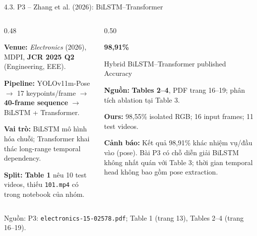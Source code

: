 \documentclass[aspectratio=169,9pt]{beamer}
\newcommand{\smallnote}[1]{{\fontsize{7.1}{8.4}\selectfont #1\par}}
\newcommand{\srcn}[1]{{\fontsize{7.0}{8.2}\selectfont\color{Muted}Nguồn: #1}}
\begin{document}
\begin{frame}{4.3. P3 -- Zhang et al. (2026): BiLSTM--Transformer}
\begin{columns}[T,onlytextwidth]
\begin{column}{0.48\textwidth}
\begin{tcolorbox}[titlepanel,title=Phương pháp và dữ liệu,height=5.00cm]
\smallnote{\textbf{Venue:} \emph{Electronics} (2026), MDPI, \textbf{JCR 2025 Q2} (Engineering, EEE).}\par\vspace{0.14cm}
\smallnote{\textbf{Pipeline:} YOLOv11m-Pose $\rightarrow$ 17 keypoints/frame $\rightarrow$ \textbf{40-frame sequence} $\rightarrow$ BiLSTM + Transformer.}\par\vspace{0.14cm}
\smallnote{\textbf{Vai trò:} BiLSTM mô hình hóa chuỗi; Transformer khai thác long-range temporal dependency.}\par\vspace{0.14cm}
\smallnote{\textbf{Split:} \textbf{Table 1} nêu 10 test videos, thiếu \texttt{101.mp4} có trong notebook của nhóm.}
\end{tcolorbox}
\end{column}
\begin{column}{0.50\textwidth}
\begin{tcolorbox}[titlepanel,title=Kết quả, bằng chứng và khác biệt,height=5.00cm]
\centering
{\fontsize{17}{19}\selectfont\bfseries\color{PTITRed}98,91\%\par}
\smallnote{Hybrid BiLSTM--Transformer published Accuracy}\par\vspace{0.11cm}
\smallnote{\textbf{Nguồn:} \textbf{Tables 2--4}, PDF trang 16--19; phân tích ablation tại Table 3.}\par\vspace{0.13cm}
\smallnote{\textbf{Ours:} 98,55\% isolated RGB; 16 input frames; 11 test videos.}\par\vspace{0.13cm}
\smallnote{\textbf{Cảnh báo:} Kết quả 98,91\% khác nhiệm vụ/đầu vào (pose). Bài P3 có chỗ diễn giải BiLSTM không nhất quán với Table 3; thời gian temporal head không bao gồm pose extraction.}
\end{tcolorbox}
\end{column}
\end{columns}
\vspace{0.06cm}
\srcn{P3: \texttt{electronics-15-02578.pdf}; Table 1 (trang 13), Tables 2--4 (trang 16--19).}
\end{frame}
\end{document}
